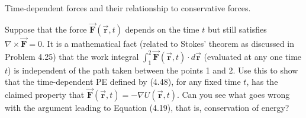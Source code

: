 \documentclass[11pt,letterpaper,boxed]{../hmcpsetrhino}
\let\oldvec\vec
\renewcommand{\vec}[1]{\oldvec{\mathbf{#1}}}
\begin{document}
\begin{solution}

\vfill
\end{solution}


\newpage

\begin{problem}[iii]
Time-dependent forces and their relationship to conservative forces.
\hfill\\
\begin{problem}[4.27]
Suppose that the force $\vec F(\vec r, t)$ depends on the time $t$ but still satisfies $\nabla \times \vec F = 0$. It is a mathematical fact (related to Stokes' theorem as discussed in Problem 4.25) that the work integral $\int_1^2 \vec F(\vec r, t) \cdot d\vec r$ (evaluated at any one time $t$) is independent of the path taken between the points 1 and 2. Use this to show that the time-dependent PE defined by (4.48), for any fixed time $t$, has the claimed property that $\vec F(\vec r, t) = - \nabla U(\vec r, t)$. Can you see what goes wrong with the argument leading to Equation (4.19), that is, conservation of energy?
\end{problem}
\vspace{-0.45cm}
\end{problem}

\begin{solution}

\vfill
\end{solution}
\end{document}
